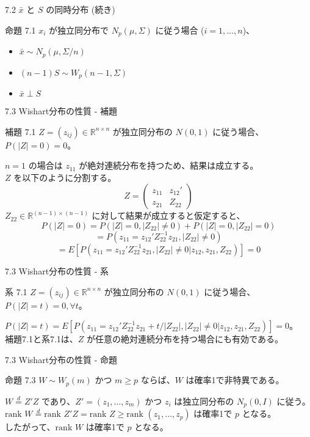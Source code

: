 \documentclass[aspectratio=169]{beamer}
\begin{document}
\begin{CJK}{UTF8}{min}
\begin{frame}{7.2 $\bar{x}$ と $S$ の同時分布 (続き)}
\begin{block}{命題 7.1}
$x_i$ が独立同分布で $N_p(\mu, \Sigma)$ に従う場合 ($i=1, \dots, n$)、
\begin{itemize}
    \item $\bar{x} \sim N_p(\mu, \Sigma/n)$ 
    \item $(n-1)S \sim W_p(n-1, \Sigma)$ 
    \item $\bar{x} \perp S$ 
\end{itemize}
\end{block}
\end{frame}

\begin{frame}{7.3 Wishart分布の性質 - 補題}
\begin{block}{補題 7.1}
$Z = (z_{ij}) \in \mathbb{R}^{n \times n}$ が独立同分布の $N(0, 1)$ に従う場合、$P(|Z| = 0) = 0$。
\end{block}

$n=1$ の場合は $z_{11}$ が絶対連続分布を持つため、結果は成立する。\\
$Z$ を以下のように分割する。
\[
Z = \begin{pmatrix} z_{11} & z_{12}' \\ z_{21} & Z_{22} \end{pmatrix}
\]
$Z_{22} \in \mathbb{R}^{(n-1) \times (n-1)}$ に対して結果が成立すると仮定すると、
\[
P(|Z|=0) = P(|Z|=0, |Z_{22}| \ne 0) + P(|Z|=0, |Z_{22}|=0)
\]
\[
= P(z_{11} = z_{12}'Z_{22}^{-1}z_{21}, |Z_{22}| \ne 0)
\]
\[
= E[P(z_{11} = z_{12}'Z_{22}^{-1}z_{21}, |Z_{22}| \ne 0 | z_{12}, z_{21}, Z_{22})] = 0
\]
\end{frame}

\begin{frame}{7.3 Wishart分布の性質 - 系}
\begin{block}{系 7.1}
$Z = (z_{ij}) \in \mathbb{R}^{n \times n}$ が独立同分布の $N(0, 1)$ に従う場合、$P(|Z| = t) = 0, \forall t$。
\end{block}

$P(|Z| = t) = E[P(z_{11} = z_{12}'Z_{22}^{-1}z_{21} + t/|Z_{22}|, |Z_{22}| \ne 0 | z_{12}, z_{21}, Z_{22})] = 0$。\\
補題7.1と系7.1は、$Z$ が任意の絶対連続分布を持つ場合にも有効である。
\end{frame}

\begin{frame}{7.3 Wishart分布の性質 - 命題}
\begin{block}{命題 7.3}
$W \sim W_p(m)$ かつ $m \ge p$ ならば、$W$ は確率1で非特異である。
\end{block}

$W \overset{d}{=} Z'Z$ であり、$Z' = (z_1, \dots, z_m)$ かつ $z_i$ は独立同分布の $N_p(0, I)$ に従う。\\
$\text{rank } W \overset{d}{=} \text{rank } Z'Z = \text{rank } Z \ge \text{rank } (z_1, \dots, z_p)$ は確率1で $p$ となる。\\
したがって、$\text{rank } W$ は確率1で $p$ となる。
\end{frame}

\end{CJK}
\end{document}
